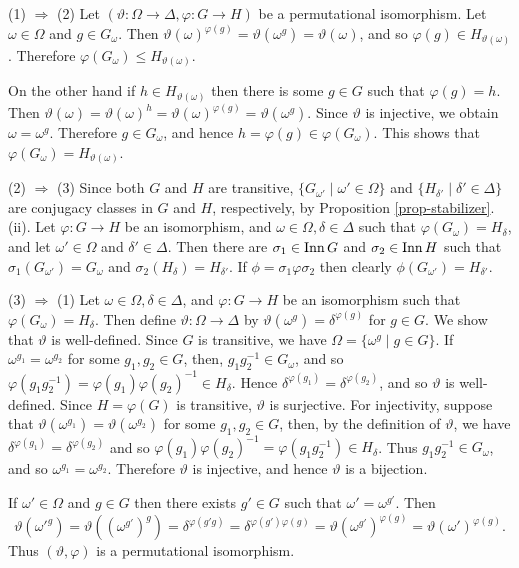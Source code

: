 \begin{sketch}
	(1) $\Rightarrow$ (2) Let $(\vartheta: \Omega  \to \Delta , \varphi: G  \to H)$ be a permutational isomorphism. Let $\omega \in \Omega $ and $g \in G_{\omega}$. Then $\vartheta(\omega) ^{\varphi (g)} = \vartheta(\omega^g) = \vartheta(\omega)$, and so $\varphi(g) \in H_{\vartheta(\omega)}$. Therefore $\varphi (G_{\omega}) \leq H_{\vartheta(\omega)}$. 
	
	On the other hand if $h \in H_{\vartheta(\omega)}$ then there is some $g \in G $ such that $\varphi(g) = h$. Then $\vartheta(\omega) = \vartheta(\omega)^{h} = \vartheta(\omega)^{\varphi(g)} = \vartheta(\omega^{g})$. Since $\vartheta$ is injective, we obtain $\omega = \omega^{g}$. Therefore $g \in G_{\omega}$, and hence $h = \varphi(g) \in \varphi(G_{\omega})$. This shows that $\varphi(G_{\omega} ) = H_{\vartheta(\omega)}$.
	
	(2) $\Rightarrow$ (3) Since both $G$ and $H$ are transitive, $\{G_{\omega'} \mid \omega' \in \Omega \}$ and $\{H_{\delta'} \mid \delta' \in \Delta \}$ are conjugacy classes in $G$ and $H$, respectively, by Proposition \ref{prop-stabilizer}.(ii). Let $\varphi: G  \to H$ be an isomorphism, and $\omega \in \Omega , \delta \in \Delta$ such that $\varphi(G_{\omega}) = H_{\delta}$, and let $\omega' \in \Omega $ and $\delta' \in \Delta $. Then there are $\sigma_1 \in \operatorname{Inn} G$ and $\sigma_2 \in \operatorname{Inn} H$ such that $\sigma_1(G_{\omega'}) = G_{\omega}$ and $\sigma_2(H_{\delta}) = H_{\delta'}$. If $\phi = \sigma_1\varphi\sigma_2$ then clearly $\phi(G_{\omega'} ) = H_{\delta'}$.
	
	(3) $\Rightarrow$ (1) Let $\omega \in \Omega , \delta \in \Delta $, and $\varphi: G  \to H$ be an isomorphism such that $\varphi(G_{\omega} ) = H_{\delta}$. Then define $\vartheta: \Omega  \to \Delta $ by $\vartheta (\omega^g)= \delta^{\varphi(g)}$ for $g \in G $. We show that $\vartheta$ is well-defined. Since $G $ is transitive, we have $\Omega = \{\omega^g\mid g\in G\}$. If $\omega^{g_1} = \omega^{g_2}$ for some $g_1, g_2 \in G $, then, $g_1g_2^{-1} \in G_{\omega}$, and so $\varphi(g_1g_2^{-1}) = \varphi(g_1)\varphi(g_2)^{-1} \in H_{\delta}$. Hence $\delta^{\varphi(g_1)} = \delta^{\varphi(g_2)}$, and so $\vartheta$ is well-defined.  Since $H = \varphi(G)$ is transitive, $\vartheta$ is surjective. For injectivity, suppose that $\vartheta(\omega^{g_1} ) = \vartheta(\omega^{g_2} )$ for some $g_1, g_2 \in G$, then, by the definition of $\vartheta$, we have $\delta^{\varphi(g_1)} = \delta^{\varphi(g_2)}$ and so $\varphi(g_1)\varphi(g_2)^{-1} = \varphi(g_1g_2^{-1}) \in H_{\delta}$. Thus $g_1g_2^{-1} \in G_{\omega}$, and so $\omega^{g_1} = \omega^{g_2}$. Therefore $\vartheta$ is injective, and hence $\vartheta$ is a bijection. 
	
	If $\omega' \in \Omega $ and $g \in G $ then there exists $g' \in G $ such that $\omega' = \omega^{g'}$. Then
	\begin{equation*}
		\vartheta(\omega'^g) = \vartheta((\omega^{g'} )^g) = \delta^{\varphi(g'g)} = \delta^{\varphi(g')\varphi(g)} = \vartheta(\omega^{g'} )^{\varphi(g)} = \vartheta(\omega')^{\varphi(g)}.
	\end{equation*}
	Thus $(\vartheta, \varphi)$ is a permutational isomorphism.
\end{sketch}
